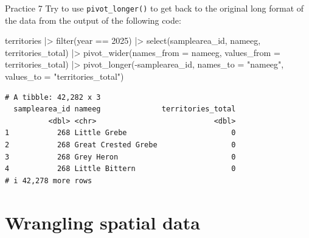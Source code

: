 \documentclass[
  ignorenonframetext,
  aspectratio=169,
  t]{beamer}
\newenvironment{Shaded}{\begin{snugshade}}{\end{snugshade}}
\newcommand{\AttributeTok}[1]{\textcolor[rgb]{0.40,0.45,0.13}{#1}}
\newcommand{\DecValTok}[1]{\textcolor[rgb]{0.68,0.00,0.00}{#1}}
\newcommand{\FunctionTok}[1]{\textcolor[rgb]{0.28,0.35,0.67}{#1}}
\newcommand{\NormalTok}[1]{\textcolor[rgb]{0.00,0.23,0.31}{#1}}
\newcommand{\SpecialCharTok}[1]{\textcolor[rgb]{0.37,0.37,0.37}{#1}}
\newcommand{\StringTok}[1]{\textcolor[rgb]{0.13,0.47,0.30}{#1}}
\let\oldtexttt\texttt
\renewcommand{\texttt}[1]{\colorbox{gray!20}{\oldtexttt{#1}}}
\begin{document}
\begin{frame}[fragile]{Practice 7}
\protect{}\label{practice-7}
Try to use \texttt{pivot\_longer()} to get back to the original long
format of the data from the output of the following code:

\footnotesize

\begin{Shaded}
\begin{Highlighting}[]
\NormalTok{territories }\SpecialCharTok{|\textgreater{}} 
    \FunctionTok{filter}\NormalTok{(year }\SpecialCharTok{==} \DecValTok{2025}\NormalTok{) }\SpecialCharTok{|\textgreater{}} 
    \FunctionTok{select}\NormalTok{(samplearea\_id, nameeg, territories\_total) }\SpecialCharTok{|\textgreater{}} 
    \FunctionTok{pivot\_wider}\NormalTok{(}\AttributeTok{names\_from =}\NormalTok{ nameeg, }
                \AttributeTok{values\_from =}\NormalTok{ territories\_total) }\SpecialCharTok{|\textgreater{}} 
    \FunctionTok{pivot\_longer}\NormalTok{(}\SpecialCharTok{{-}}\NormalTok{samplearea\_id,}
                 \AttributeTok{names\_to =} \StringTok{"nameeg"}\NormalTok{,}
                 \AttributeTok{values\_to =} \StringTok{"territories\_total"}\NormalTok{)}
\end{Highlighting}
\end{Shaded}

\begin{verbatim}
# A tibble: 42,282 x 3
  samplearea_id nameeg              territories_total
          <dbl> <chr>                           <dbl>
1           268 Little Grebe                        0
2           268 Great Crested Grebe                 0
3           268 Grey Heron                          0
4           268 Little Bittern                      0
# i 42,278 more rows
\end{verbatim}

\normalsize
\end{frame}

\section{Wrangling spatial data}\label{wrangling-spatial-data}
\end{document}
